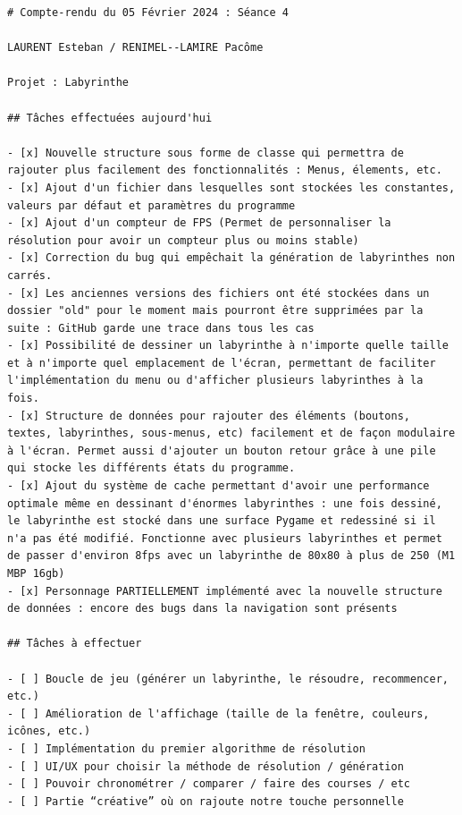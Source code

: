 \documentclass[12pt]{scrreprt} %
\begin{document}
\begin{verbatim}
# Compte-rendu du 05 Février 2024 : Séance 4

LAURENT Esteban / RENIMEL--LAMIRE Pacôme

Projet : Labyrinthe

## Tâches effectuées aujourd'hui

- [x] Nouvelle structure sous forme de classe qui permettra de rajouter plus facilement des fonctionnalités : Menus, élements, etc.
- [x] Ajout d'un fichier dans lesquelles sont stockées les constantes, valeurs par défaut et paramètres du programme
- [x] Ajout d'un compteur de FPS (Permet de personnaliser la résolution pour avoir un compteur plus ou moins stable)
- [x] Correction du bug qui empêchait la génération de labyrinthes non carrés.
- [x] Les anciennes versions des fichiers ont été stockées dans un dossier "old" pour le moment mais pourront être supprimées par la suite : GitHub garde une trace dans tous les cas
- [x] Possibilité de dessiner un labyrinthe à n'importe quelle taille et à n'importe quel emplacement de l'écran, permettant de faciliter l'implémentation du menu ou d'afficher plusieurs labyrinthes à la fois.
- [x] Structure de données pour rajouter des éléments (boutons, textes, labyrinthes, sous-menus, etc) facilement et de façon modulaire à l'écran. Permet aussi d'ajouter un bouton retour grâce à une pile qui stocke les différents états du programme.
- [x] Ajout du système de cache permettant d'avoir une performance optimale même en dessinant d'énormes labyrinthes : une fois dessiné, le labyrinthe est stocké dans une surface Pygame et redessiné si il n'a pas été modifié. Fonctionne avec plusieurs labyrinthes et permet de passer d'environ 8fps avec un labyrinthe de 80x80 à plus de 250 (M1 MBP 16gb)
- [x] Personnage PARTIELLEMENT implémenté avec la nouvelle structure de données : encore des bugs dans la navigation sont présents

## Tâches à effectuer

- [ ] Boucle de jeu (générer un labyrinthe, le résoudre, recommencer, etc.)
- [ ] Amélioration de l'affichage (taille de la fenêtre, couleurs, icônes, etc.)
- [ ] Implémentation du premier algorithme de résolution
- [ ] UI/UX pour choisir la méthode de résolution / génération
- [ ] Pouvoir chronométrer / comparer / faire des courses / etc
- [ ] Partie “créative” où on rajoute notre touche personnelle

\end{verbatim}
\end{document}
